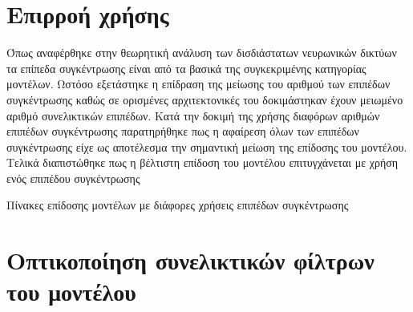 \section{Επιρροή χρήσης }
Όπως αναφέρθηκε στην θεωρητική ανάλυση των δισδιάστατων νευρωνικών δικτύων τα επίπεδα συγκέντρωσης είναι από τα βασικά της συγκεκριμένης κατηγορίας μοντέλων. Ωστόσο εξετάστηκε η επίδραση της μείωσης του αριθμού των επιπέδων συγκέντρωσης καθώς σε ορισμένες αρχιτεκτονικές του δοκιμάστηκαν έχουν μειωμένο αριθμό συνελικτικών επιπέδων. Κατά την δοκιμή της χρήσης διαφόρων αριθμών επιπέδων συγκέντρωσης παρατηρήθηκε πως η αφαίρεση όλων των επιπέδων συγκέντρωσης είχε ως αποτέλεσμα την σημαντική μείωση της επίδοσης του μοντέλου. Τελικά διαπιστώθηκε πως η βέλτιστη επίδοση του μοντέλου επιτυγχάνεται με χρήση ενός επιπέδου συγκέντρωσης

Πίνακες επίδοσης μοντέλων με διάφορες χρήσεις επιπέδων συγκέντρωσης

\section{Οπτικοποίηση συνελικτικών φίλτρων του μοντέλου}
